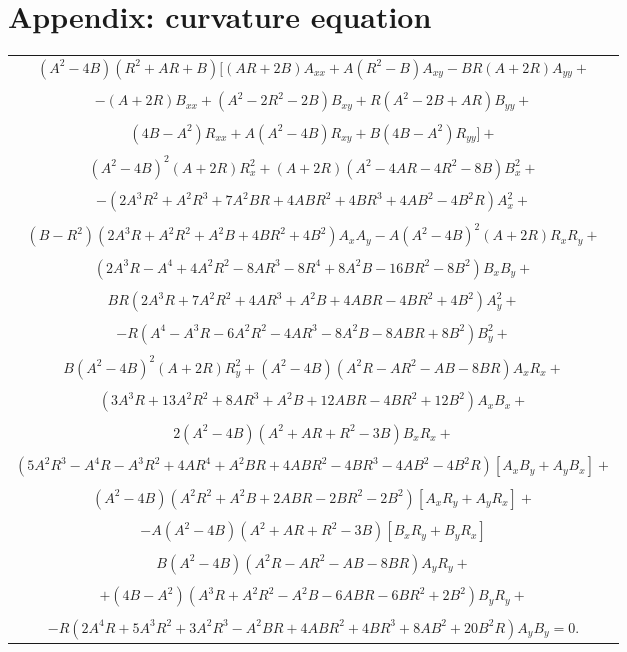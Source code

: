 \documentclass[11pt,a4paper]{article}
\begin{document}
\section*{Appendix: curvature equation}
\begin{longtable}{c}
$(A^2 - 4B)(R^2 +AR+ B)[(AR + 2B)A_{xx}+A(R^2-B)A_{xy}-BR(A + 2R)A_{yy}+$\\
\\
$-(A + 2R)B_{xx}+ (A^2-2R^2- 2B)B_{xy}+R(A^2 -2B+AR)B_{yy}+$\\
\\
$(4B-A^2)R_{xx}+A(A^2 - 4B)R_{xy}+B(4B-A^2)R_{yy}]+$\\
\\
$(A^2 - 4B)^2(A + 2R)R_x^2+(A + 2R)(A^2 - 4AR - 4R^2 - 8B)B_x^2+$\\
\\
$ - (2A^3R^2 + A^2R^3 + 7A^2BR + 4ABR^2 + 4BR^3 + 4AB^2 - 4B^2R)A_x^2+$\\
\\
$(B-R^2)(2A^3R + A^2R^2 + A^2B + 4BR^2 + 4B^2)A_xA_y - A(A^2 - 4B)^2(A + 2R)R_xR_y+$\\
\\
$ ( 2A^3R-A^4  + 4A^2R^2 - 8AR^3 - 8R^4 + 8A^2B - 16BR^2 - 8B^2)B_xB_y+$\\
 \\
$BR(2A^3R + 7A^2R^2 + 4AR^3 + A^2B + 4ABR - 4BR^2 + 4B^2)A_y^2+$\\
 \\
$ -R(A^4 - A^3R - 6A^2R^2 - 4AR^3 - 8A^2B - 8ABR + 8B^2)B_y^2+$\\
 \\
 $ B(A^2 - 4B)^2(A + 2R)R_y^2 +(A^2 - 4B)(A^2R - AR^2 - AB - 8BR)A_xR_x+$\\
  \\
 $ (3A^3R + 13A^2R^2 + 8AR^3 + A^2B + 12ABR - 4BR^2 + 12B^2)A_xB_x+$\\
  \\
 $ 2(A^2 - 4B)(A^2 + AR + R^2 - 3B)B_xR_x+$\\
  \\
$ ( 5A^2R^3-A^4R - A^3R^2  + 4AR^4 + A^2BR + 4ABR^2 - 4BR^3 - 4AB^2 - 4B^2R)[A_xB_y+A_yB_x]+$\\
 \\
$(A^2 - 4B)(A^2R^2 + A^2B + 2ABR - 2BR^2 - 2B^2)[A_xR_y+A_yR_x] +$\\
  \\
 $ -A(A^2 - 4B)(A^2 + AR + R^2 - 3B)[B_xR_y+B_yR_x]$\\
  \\
 $ B(A^2 - 4B)(A^2R - AR^2 - AB - 8BR)A_yR_y+$\\
  \\
  $+(4B-A^2 )(A^3R + A^2R^2 - A^2B - 6ABR - 6BR^2 + 2B^2)B_yR_y+$\\
  \\
  $-R(2A^4R + 5A^3R^2 + 3A^2R^3 - A^2BR + 4ABR^2 + 4BR^3 + 8AB^2 + 20B^2R)A_yB_y=0.$
\end{longtable}
\end{document}
